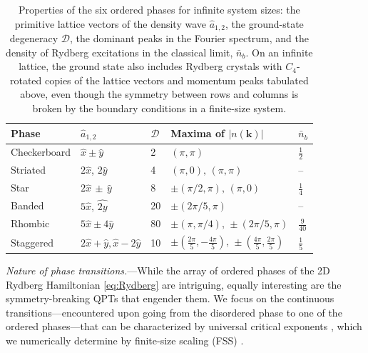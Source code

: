 \documentclass[prl,twocolumn,superscriptaddress,showpacs,amsmath,amstex,amssymb,citeautoscript]{revtex4-1}
\newcommand{\vect}[1]{\boldsymbol{#1}}
\begin{document}
\bgroup
\def\arraystretch{1.5}
\begin{table}[t]
\centering
{
\bgroup
\setlength{\tabcolsep}{1pt}
\begin{ruledtabular}
\begin{tabular}{l l l l l } 
\multicolumn{1}{l}{Phase} &\multicolumn{1}{l}{{\normalsize $\hat{a}^{}_{1,2}$}} &\multicolumn{1}{l}{$\mathcal{D}$}  &\multicolumn{1}{l}{Maxima of $\lvert n(\vect{k}) \rvert$} &\multicolumn{1}{l}{{\normalsize $\bar{n}^{}_b$}} \\
\hline
Checkerboard & $\hat{x} \pm \hat{y}$ & 2  & $(\pi, \pi)$ & $\frac{1}{2}$ \\
Striated & $2 \hat{x}$, $2 \hat{y}$ & 4  & $(\pi, 0),\,(\pi, \pi)$ & -- \\
Star  & $2 \hat{x}\, \pm\, \hat{y}$ & 8& $\pm(\pi/2, \pi),\, (\pi, 0)$ & $\frac{1}{4}$ \\
Banded  & $5 \hat{x},\, \hat{2y}$& 20 & $\pm(2 \pi/5, \pi)$ & --  \\
Rhombic  & $5 \hat{x} \pm 4 \hat{y}$& 80 & $\pm (\pi,  \pi/4), \, \pm(2 \pi/5, \pi)$ & $\frac{9}{40}$  \\
Staggered  & $2 \hat{x} + \hat{y},  \hat{x} - 2 \hat{y}$ & 10 & $\pm (\frac{2 \pi}{5}, -\frac{4 \pi}{5}),\, \pm(\frac{4 \pi}{5}, \frac{2\pi}{5})$  &$  \frac{1}{5}$ \\
\end{tabular}
\end{ruledtabular}
}
\egroup
\caption{\label{Table:z}Properties of the six ordered phases for infinite system sizes: the primitive lattice vectors of the density wave $\hat{a}^{}_{1,2}$, the ground-state degeneracy $\mathcal{D}$, the dominant peaks in the Fourier spectrum, and the density of Rydberg excitations in the classical limit, $\bar{n}_b$. On an infinite lattice, the ground state also includes Rydberg crystals with $C_4$-rotated copies of the lattice vectors and momentum peaks tabulated above, even though the symmetry between rows and columns is broken by the boundary conditions in a finite-size system. }
\end{table}
\egroup




  
 
 
 \emph{Nature of phase transitions.}---While the array of ordered phases of the 2D Rydberg Hamiltonian \eqref{eq:Rydberg} are intriguing, %
 equally interesting are the symmetry-breaking QPTs that engender them. %
 We focus on the continuous transitions---encountered upon going from the disordered phase to one of the ordered phases---that can be characterized by 
 universal critical exponents \cite{sachdev2011quantum, dutta2015quantum}, which we numerically determine by finite-size scaling (FSS) \cite{fisher1972scaling, hamer1980finite}. 
 
\end{document}
